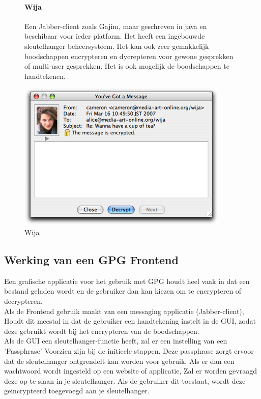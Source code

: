 \documentclass[12pt]{article}
\begin{document}
				\begin{figure}[!ht]				
					\paragraph{Wija}
						Een Jabber-client zoals Gajim, maar geschreven in java en beschibaar voor 								ieder platform.
						Het heeft een ingebouwde sleutelhanger beheersysteem. Het kan ook zeer 									gemakkelijk boodschappen encrypteren en dycrepteren voor gewone gesprekken of 							multi-user gesprekken.
						Het is ook mogelijk de boodschappen te handtekenen.
					\begin{center}
						\includegraphics[scale=0.7]{Pictures/wija}
					\end{center}
					\caption{Wija}
				\end{figure}
				
		\subsection{Werking van een GPG Frontend}\label{Frontend}
			Een grafische applicatie voor het gebruik met GPG houdt heel vaak in dat een bestand
			geladen wordt en de gebruiker dan kan kiezen om te encrypteren of decrypteren.\\
			Als de Frontend gebruik maakt van een messaging applicatie (Jabber-client),
			Houdt dit meestal in dat de gebruiker een handtekening instelt in de GUI,
			zodat deze gebruikt wordt bij het encrypteren van de boodschappen.\\
			Als de GUI een sleutelhanger-functie heeft, zal er een instelling van een 'Passphrase'
			Voorzien zijn bij de initieele stappen. Deze passphrase zorgt ervoor dat de sleutelhanger
			ontgrendelt kan worden voor gebruik. Als er dan een wachtwoord wordt ingesteld op een
			website of applicatie, Zal er worden gevraagd deze op te slaan in je sleutelhanger.
			Als de gebruiker dit toestaat, wordt deze geincrypteerd toegevoegd aan je sleutelhanger.
						
\end{document}
